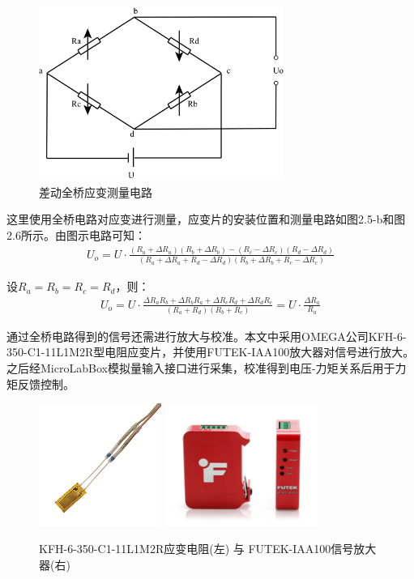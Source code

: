 \begin{figure}[htb]
    \includegraphics[width=8cm]{fig/f25.jpg}
    \caption{差动全桥应变测量电路}
    \label{fig:mark}
\end{figure}

这里使用全桥电路对应变进行测量，应变片的安装位置和测量电路如图2.5-b和图2.6所示。由图示电路可知：
\begin{align}
U_o = U\cdot \frac{(R_a + \Delta R_a)(R_b + \Delta R_b) - (R_c - \Delta R_c)(R_d - \Delta R_d)}{(R_a + \Delta R_a + R_d - \Delta R_d)(R_b + \Delta R_b + R_c - \Delta R_c)}
\end{align}

设$R_a = R_b = R_c = R_d$，则：
\begin{align}
U_o = U\cdot \frac{\Delta R_a R_b + \Delta R_b R_a + \Delta R_c R_d + \Delta R_d R_c}{(R_a + R_d)(R_b + R_c)}= U\cdot \frac{\Delta R_a}{R_a}
\end{align}

通过全桥电路得到的信号还需进行放大与校准。本文中采用OMEGA公司KFH-6-350-C1-11L1M2R型电阻应变片，并使用FUTEK-IAA100放大器对信号进行放大。之后经MicroLabBox模拟量输入接口进行采集，校准得到电压-力矩关系后用于力矩反馈控制。

\begin{figure}[htb]
    \includegraphics[width=4cm]{fig/f28.jpg}\quad
    \includegraphics[width=5cm]{fig/f28.png}
    \caption{KFH-6-350-C1-11L1M2R应变电阻(左) 与 FUTEK-IAA100信号放大器(右)}
    \label{fig:subfigss}
\end{figure}

